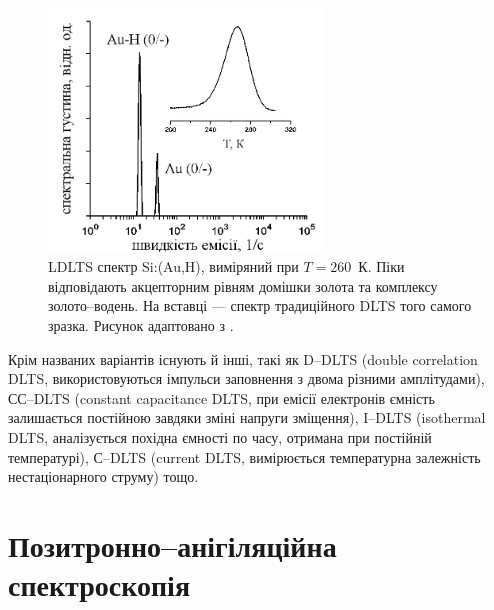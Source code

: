 \documentclass[10pt,a5paper,titlepage,oneside]{book}
\numberwithin{equation}{part}
\begin{document}
\begin{figure}[!t]
\center
\vspace{-5mm}
\includegraphics[width=0.65\textwidth]{Fig2_6}
\vspace{-3mm}
\caption{LDLTS спектр Si:(Au,H), виміряний при $T=260$~К.
Піки відповідають акцепторним рівням домішки золота та комплексу
золото--водень.
На вставці --- спектр традиційного DLTS того самого зразка.
Рисунок адаптовано з \cite{Deixler}.
}
\vspace{-3mm}
\label{F26}
\end{figure}

Крім названих варіантів існують й інші, такі як
D--DLTS (double correlation DLTS, використовуються імпульси заповнення з двома різними амплітудами),
СС--DLTS (constant capacitance DLTS, при емісії електронів ємність
залишається постійною завдяки зміні напруги зміщення),
I--DLTS (isothermal DLTS, аналізується похідна ємності по часу, отримана при постійній температурі),
С--DLTS (current DLTS, вимірюється температурна залежність нестаціонарного струму)
тощо.

\chapter{Позитронно--анігіляційна спектроскопія}\label{chapPAS}

\cite{PAS}




\end{document}
